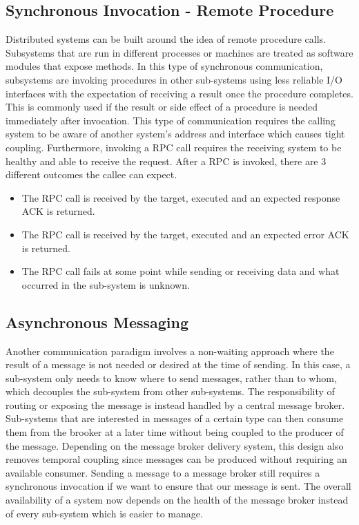 \documentclass[11pt]{article}
\begin{document}
\subsection{Synchronous Invocation - Remote Procedure}
Distributed systems can be built around the idea of remote procedure calls. Subsystems that are run in different processes or machines are treated as software modules that expose methods. In this type of synchronous communication, subsystems are invoking procedures in other sub-systems using less reliable I/O interfaces with the expectation of receiving a result once the procedure completes. This is commonly used if the result or side effect of a procedure is needed immediately after invocation.
\newline
\newline
This type of communication requires the calling system to be aware of another system's address and interface which causes tight coupling. Furthermore, invoking a RPC call requires the receiving system to be healthy and able to receive the request. After a RPC is invoked, there are 3 different outcomes the callee can expect.
\newline
\begin{itemize}
\item The RPC call is received by the target, executed and an expected response ACK is returned.
\item The RPC call is received by the target, executed and an expected error ACK is returned.
\item The RPC call fails at some point while sending or receiving data and what occurred in the sub-system is unknown.
\end{itemize}



\subsection{Asynchronous Messaging}
Another communication paradigm involves a non-waiting approach where the result of a message is not needed or desired at the time of sending. In this case, a sub-system only needs to know where to send messages, rather than to whom, which decouples the sub-system from other sub-systems. The responsibility of routing or exposing the message is instead handled by a central message broker.
\newline
\newline
Sub-systems that are interested in messages of a certain type can then consume them from the brooker at a later time without being coupled to the producer of the message. Depending on the message broker delivery system, this design also removes temporal coupling since messages can be produced without requiring an available consumer. Sending a message to a message broker still requires a synchronous invocation if we want to ensure that our message is sent. The overall availability of a system now depends on the health of the message broker instead of every sub-system which is easier to manage.
\end{document}
